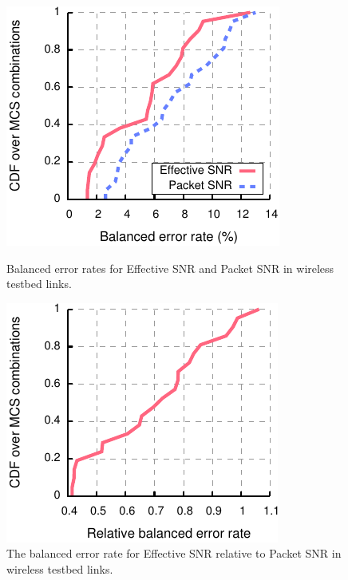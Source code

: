 \begin{figure}[htbp]
  \begin{minipage}{0.48\textwidth}
  \centering
  \includegraphics[width=\textwidth]{figures/delivery_figures/goodbad/error_rates.pdf}
  \caption[Balanced error rates for Effective SNR and Packet SNR]{Balanced error rates for Effective SNR and Packet SNR in wireless testbed links.}
  \label{fig:balanced_error}
  \end{minipage}
  \hfill
  \begin{minipage}{0.48\textwidth}
  \centering
  \includegraphics[width=\textwidth]{figures/delivery_figures/goodbad/error_ratio.pdf}
  \caption[Balanced error rate for Effective SNR relative to Packet SNR]{The balanced error rate for Effective SNR relative to Packet SNR in wireless testbed links.}
  \label{fig:balanced_error_ratio}
  \end{minipage}
\end{figure}
